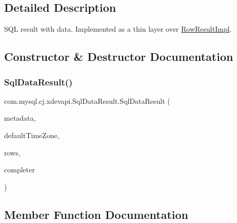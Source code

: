 \subsection{Detailed Description}
S\+QL result with data. Implemented as a thin layer over \mbox{\hyperlink{classcom_1_1mysql_1_1cj_1_1xdevapi_1_1_row_result_impl}{Row\+Result\+Impl}}. 

\subsection{Constructor \& Destructor Documentation}
\mbox{\label{classcom_1_1mysql_1_1cj_1_1xdevapi_1_1_sql_data_result_a093eac6f7bdb99d8f0130150171231dc}} 
\subsubsection{\texorpdfstring{Sql\+Data\+Result()}{SqlDataResult()}}
{\footnotesize\ttfamily com.\+mysql.\+cj.\+xdevapi.\+Sql\+Data\+Result.\+Sql\+Data\+Result (\begin{DoxyParamCaption}\item[{\mbox{\hyperlink{interfacecom_1_1mysql_1_1cj_1_1protocol_1_1_column_definition}{Column\+Definition}}}]{metadata,  }\item[{Time\+Zone}]{default\+Time\+Zone,  }\item[{\mbox{\hyperlink{interfacecom_1_1mysql_1_1cj_1_1result_1_1_row_list}{Row\+List}}}]{rows,  }\item[{Supplier$<$ \mbox{\hyperlink{classcom_1_1mysql_1_1cj_1_1protocol_1_1x_1_1_statement_execute_ok}{Statement\+Execute\+Ok}} $>$}]{completer }\end{DoxyParamCaption})}



\subsection{Member Function Documentation}
\mbox{\label{classcom_1_1mysql_1_1cj_1_1xdevapi_1_1_sql_data_result_a84d9f2a000e9babce642708126dbb124}} 
